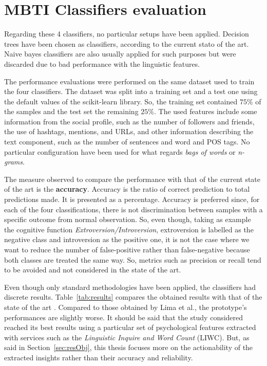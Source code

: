 \section{MBTI Classifiers evaluation}
Regarding these 4 classifiers, no particular setups have been applied.
Decision trees have been chosen as classifiers, according to the current stato of the art.
Naive bayes classifiers are also usually applied for such purposes but were discarded due to bad performance with the linguistic features.

The performance evaluations were performed on the same dataset used to train the four classifiers.
The dataset was split into a training set and a test one using the default values of the scikit-learn library. So, the training set contained $75\%$ of the samples and the test set the remaining $25\%$.
The used features include some information from the social profile, such as the number of followers and friends, the use of hashtags, mentions, and URLs, and other information describing the text component, such as the number of sentences and word and POS tags.
No particular configuration have been used for what regards \textit{bags of words} or \textit{n-grams}.

The measure observed to compare the performance with that of the current state of the art is the \textbf{accuracy}.
Accuracy is the ratio of correct prediction to total predictions made. It is presented as a percentage.
Accuracy is preferred since, for each of the four classifications, there is not discrimination between samples with a specific outcome from normal observation.
So, even though, taking as example the cognitive function \textit{Extroversion/Introversion}, extroversion is labelled as the negative class and introversion as the positive one, it is not the case where we want to reduce the number of false-positive rather than false-negative because both classes are treated the same way.
So, metrics such as precision or recall tend to be avoided and not considered in the state of the art.

Even though only standard methodologies have been applied, the classifiers had discrete results. 
Table~\ref{tab:results} compares the obtained results with that of the state of the art \cite{lima2019tecla}.
Compared to those obtained by Lima et al., the prototype's performances are slightly worse. 
It should be said that the study considered reached its best results using a particular set of psychological features extracted with services such as the \textit{Linguistic Inquire and Word Count} (LIWC).
But, as said in Section~\ref{sec:resObj}, this thesis focuses more on the actionability of the extracted insights rather than their accuracy and reliability.

